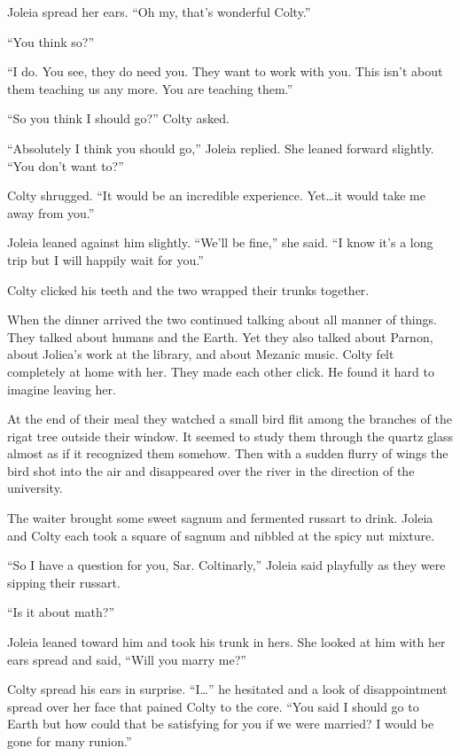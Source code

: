 Joleia spread her ears. ``Oh my, that's wonderful Colty.''

``You think so?''

``I do. You see, they do need you. They want to work with you. This isn't about them teaching us
any more. You are teaching them.''

``So you think I should go?'' Colty asked.

``Absolutely I think you should go,'' Joleia replied. She leaned forward slightly. ``You don't
want to?''

Colty shrugged. ``It would be an incredible experience. Yet\ldots it would take me away from
you.''

Joleia leaned against him slightly. ``We'll be fine,'' she said. ``I know it's a long trip but
I will happily wait for you.''

Colty clicked his teeth and the two wrapped their trunks together.

When the dinner arrived the two continued talking about all manner of things. They talked about
humans and the Earth. Yet they also talked about Parnon, about Joliea's work at the library,
and about Mezanic music. Colty felt completely at home with her. They made each other click. He
found it hard to imagine leaving her.

At the end of their meal they watched a small bird flit among the branches of the rigat tree
outside their window. It seemed to study them through the quartz glass almost as if it
recognized them somehow. Then with a sudden flurry of wings the bird shot into the air and
disappeared over the river in the direction of the university.

The waiter brought some sweet sagnum and fermented russart to drink. Joleia and Colty each took
a square of sagnum and nibbled at the spicy nut mixture.

``So I have a question for you, Sar. Coltinarly,'' Joleia said playfully as they were sipping
their russart.

``Is it about math?''

Joleia leaned toward him and took his trunk in hers. She looked at him with her ears spread and
said, ``Will you marry me?''

Colty spread his ears in surprise. ``I\ldots'' he hesitated and a look of disappointment spread
over her face that pained Colty to the core. ``You said I should go to Earth but how could that
be satisfying for you if we were married? I would be gone for many runion.''

